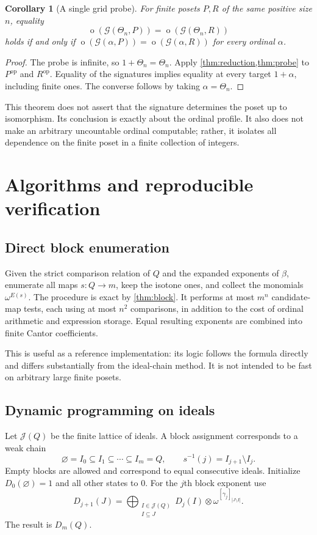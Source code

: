 \documentclass[11pt,a4paper]{article}
\newtheorem{corollary}[corollary]{Corollary}
\theoremstyle{definition}
\theoremstyle{remark}
\newcommand{\Grid}{\mathcal{G}}
\newcommand{\otype}{\operatorname{o}}
\newcommand{\op}{\mathrm{op}}
\newcommand{\Id}{\mathcal{J}}
\newcommand{\Nrep}[2]{\left[#1\right]_{#2}}
\begin{document}
\begin{corollary}[A single grid probe]\label{cor:gridprobe}
For finite posets $P,R$ of the same positive size $n$, equality
\[
 \otype(\Grid(\Theta_n,P))=\otype(\Grid(\Theta_n,R))
\]
holds if and only if
$\otype(\Grid(\alpha,P))=\otype(\Grid(\alpha,R))$ for every ordinal
$\alpha$.
\end{corollary}
\begin{proof}
The probe is infinite, so $1+\Theta_n=\Theta_n$. Apply
\cref{thm:reduction,thm:probe} to $P^{\op}$ and $R^{\op}$. Equality of
the signatures implies equality at every target $1+\alpha$, including
finite ones. The converse follows by taking $\alpha=\Theta_n$.
\end{proof}

This theorem does not assert that the signature determines the poset up
to isomorphism. Its conclusion is exactly about the ordinal profile.
It also does not make an arbitrary uncountable ordinal computable; rather,
it isolates all dependence on the finite poset in a finite collection of
integers.

\section{Algorithms and reproducible verification}

\subsection{Direct block enumeration}
Given the strict comparison relation of $Q$ and the expanded exponents of
$\beta$, enumerate all maps $s:Q\to m$, keep the isotone ones, and collect
the monomials $\omega^{E(s)}$. The procedure is exact by
\cref{thm:block}. It performs at most $m^n$ candidate-map tests, each using
at most $n^2$ comparisons, in addition to the cost of ordinal arithmetic
and expression storage. Equal resulting exponents are combined into
finite Cantor coefficients.

This is useful as a reference implementation: its logic follows the
formula directly and differs substantially from the ideal-chain method.
It is not intended to be fast on arbitrary large finite posets.

\subsection{Dynamic programming on ideals}
Let $\Id(Q)$ be the finite lattice of ideals. A block assignment corresponds
to a weak chain
\[
 \varnothing=I_0\subseteq I_1\subseteq\cdots\subseteq I_m=Q,
 \qquad s^{-1}(j)=I_{j+1}\setminus I_j.
\]
Empty blocks are allowed and correspond to equal consecutive ideals.
Initialize $D_0(\varnothing)=1$ and all other states to $0$. For the $j$th
block exponent use
\begin{equation}\label{eq:DP}
 D_{j+1}(J)=
 \bigoplus_{\substack{I\in\Id(Q)\\I\subseteq J}}
 D_j(I)\otimes\omega^{\Nrep{\gamma_j}{|J\setminus I|}}.
\end{equation}
The result is $D_m(Q)$.
\end{document}

